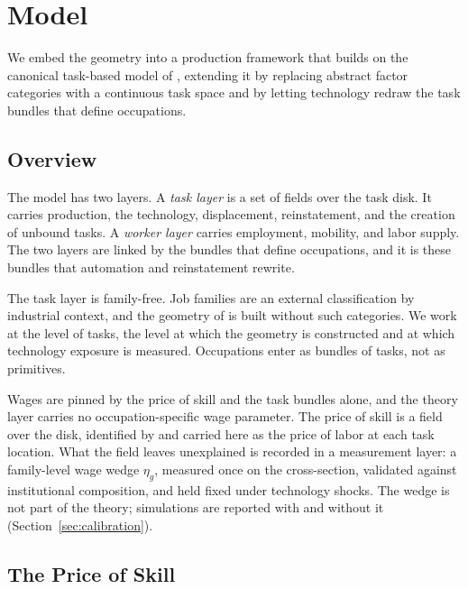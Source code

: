 \documentclass[12pt, a4paper]{article}
\begin{document}
\section{Model}
\label{sec:model}

We embed the geometry into a production framework that builds on the
canonical task-based model of \textcite{acemoglu2019automation},
extending it by replacing abstract factor categories with a
continuous task space and by letting technology redraw the task
bundles that define occupations.

\subsection{Overview}
\label{sec:overview}

The model has two layers. A \emph{task layer} is a set of fields over
the task disk. It carries production, the technology, displacement,
reinstatement, and the creation of unbound tasks. A \emph{worker
layer} carries employment, mobility, and labor supply. The two layers
are linked by the bundles that define occupations, and it is these
bundles that automation and reinstatement rewrite.

The task layer is family-free. Job families are an external
classification by industrial context, and the geometry of
\textcite{storck2026geometry} is built without such categories. We work
at the level of tasks, the level at which the geometry is constructed
and at which technology exposure is measured. Occupations enter as
bundles of tasks, not as primitives.

Wages are pinned by the price of skill and the task bundles alone, and
the theory layer carries no occupation-specific wage parameter. The
price of skill is a field over the disk, identified by
\textcite{storck2026geometry} and carried here as the price of labor at
each task location. What the field leaves unexplained is recorded in a
measurement layer: a family-level wage wedge $\eta_g$, measured once on
the cross-section, validated against institutional composition, and
held fixed under technology shocks. The wedge is not part of the
theory; simulations are reported with and without it
(Section~\ref{sec:calibration}).

\subsection{The Price of Skill}
\label{sec:price}
\end{document}
